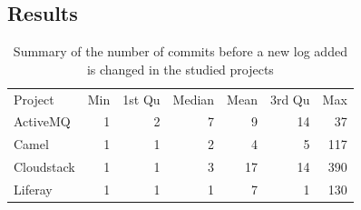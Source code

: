 




%	



%	





\subsection{Results}

\begin{table}[tb]
	\centering
	\caption{Summary of the number of commits before a new log added is changed in the studied projects}
	
	\begin{tabular}{lrrrrrr}
			\cline{1-7}
		Project    & Min & 1st Qu & Median & Mean & 3rd Qu & Max \\
		\cline{1-7}
		ActiveMQ   & 1   & 2      & 7      & 9    & 14     & 37  \\
		Camel      & 1   & 1      & 2      & 4    & 5      & 117 \\
		Cloudstack & 1   & 1      & 3      & 17   & 14     & 390 \\
		Liferay    & 1   & 1      & 1      & 7    & 1      & 130\\	\cline{1-7}
		
	\end{tabular}
	\label{tba:summaryofnewLogchange}
\end{table}



